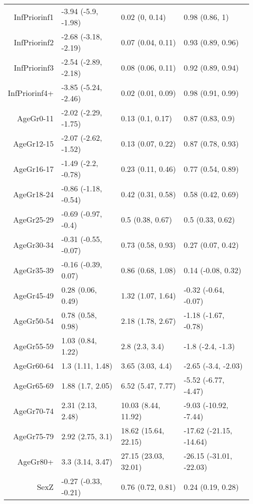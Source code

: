 \begin{table}[ht]
\begin{tabular}{rlll}
  InfPriorinf1 & -3.94 (-5.9, -1.98) & 0.02 (0, 0.14) & 0.98 (0.86, 1) \\ 
  InfPriorinf2 & -2.68 (-3.18, -2.19) & 0.07 (0.04, 0.11) & 0.93 (0.89, 0.96) \\ 
  InfPriorinf3 & -2.54 (-2.89, -2.18) & 0.08 (0.06, 0.11) & 0.92 (0.89, 0.94) \\ 
  InfPriorinf4+ & -3.85 (-5.24, -2.46) & 0.02 (0.01, 0.09) & 0.98 (0.91, 0.99) \\ 
  AgeGr0-11 & -2.02 (-2.29, -1.75) & 0.13 (0.1, 0.17) & 0.87 (0.83, 0.9) \\ 
  AgeGr12-15 & -2.07 (-2.62, -1.52) & 0.13 (0.07, 0.22) & 0.87 (0.78, 0.93) \\ 
  AgeGr16-17 & -1.49 (-2.2, -0.78) & 0.23 (0.11, 0.46) & 0.77 (0.54, 0.89) \\ 
  AgeGr18-24 & -0.86 (-1.18, -0.54) & 0.42 (0.31, 0.58) & 0.58 (0.42, 0.69) \\ 
  AgeGr25-29 & -0.69 (-0.97, -0.4) & 0.5 (0.38, 0.67) & 0.5 (0.33, 0.62) \\ 
  AgeGr30-34 & -0.31 (-0.55, -0.07) & 0.73 (0.58, 0.93) & 0.27 (0.07, 0.42) \\ 
  AgeGr35-39 & -0.16 (-0.39, 0.07) & 0.86 (0.68, 1.08) & 0.14 (-0.08, 0.32) \\ 
  AgeGr45-49 & 0.28 (0.06, 0.49) & 1.32 (1.07, 1.64) & -0.32 (-0.64, -0.07) \\ 
  AgeGr50-54 & 0.78 (0.58, 0.98) & 2.18 (1.78, 2.67) & -1.18 (-1.67, -0.78) \\ 
  AgeGr55-59 & 1.03 (0.84, 1.22) & 2.8 (2.3, 3.4) & -1.8 (-2.4, -1.3) \\ 
  AgeGr60-64 & 1.3 (1.11, 1.48) & 3.65 (3.03, 4.4) & -2.65 (-3.4, -2.03) \\ 
  AgeGr65-69 & 1.88 (1.7, 2.05) & 6.52 (5.47, 7.77) & -5.52 (-6.77, -4.47) \\ 
  AgeGr70-74 & 2.31 (2.13, 2.48) & 10.03 (8.44, 11.92) & -9.03 (-10.92, -7.44) \\ 
  AgeGr75-79 & 2.92 (2.75, 3.1) & 18.62 (15.64, 22.15) & -17.62 (-21.15, -14.64) \\ 
  AgeGr80+ & 3.3 (3.14, 3.47) & 27.15 (23.03, 32.01) & -26.15 (-31.01, -22.03) \\ 
  SexZ & -0.27 (-0.33, -0.21) & 0.76 (0.72, 0.81) & 0.24 (0.19, 0.28) \\ 
   \hline
\end{tabular}
\end{table}
